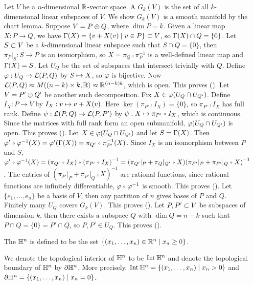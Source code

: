 \documentclass[10pt]{article}
\begin{document}
\begin{example}
    Let $V$ be a $n$-dimensional $\mathbb{R}$-vector space. A  ${G}_{k}(V)$ is the set of all $k$-dimensional linear subspaces of $V$. We show ${G}_{k}(V)$ is a smooth manifold by the chart lemma. Suppose $V=P\oplus Q$, where $\dim P=k$. Given a linear map $X:P\to Q$, we have $\Gamma(X)=\{v+X(v)\mid v\in P\}\subset V$, so $\Gamma(X)\cap Q=\{0\}$. Let $S\subset V$ be a $k$-dimensional linear subspace such that $S\cap Q=\{0\}$, then ${\pi}_{P}{|}_{S}:S\to P$ is an isomorphism, so $X={\pi}_{Q}\comp{\pi}_{P}^{-1}$ is a well-defined linear map and $\Gamma(X)=S$. Let ${U}_{Q}$ be the set of subspaces that intersect trivially with $Q$. Define $\varphi:{U}_{Q}\to\mathcal{L}(P,Q)$ by $S\mapsto X$, so $\varphi$ is bijective. Now $\mathcal{L}(P,Q)\approx M((n-k)\times k,\mathbb{R})\approx{\mathbb{R}}^{(n-k)k}$, which is open. This proves (). Let $V=P'\oplus Q'$ be another such decomposition. Fix $X\in\varphi({U}_{Q}\cap{U}_{Q'})$. Define ${I}_{X}:P\to V$ by ${I}_{X}:v\mapsto v+X(v)$. Here $\ker({\pi}_{P'}\comp{I}_{X})=\{0\}$, so ${\pi}_{P'}\comp{I}_{X}$ has full rank. Define $\psi:\mathcal{L}(P,Q)\to\mathcal{L}(P,P')$ by $\psi:X\mt{\pi}_{P'}\comp{I}_{X}$, which is continuous. Since the matrices with full rank form an open submanifold, $\varphi({U}_{Q}\cap{U}_{Q'})$ is open. This proves (). Let $X\in\varphi({U}_{Q}\cap{U}_{Q'})$ and let $S=\Gamma(X)$. Then $\vp'\comp{\vp}^{-1}(X)=\vp'(\Ga(X))={\pi}_{Q'}\comp{\pi}_{P'}^{-1}(X)$. Since ${I}_{X}$ is an isomorphism between $P$ and $S$, $\vp'\comp{\vp}^{-1}(X)=({\pi}_{Q'}\comp{I}_{X})\comp{({\pi}_{P'}\comp{I}_{X})}^{-1}=({\pi}_{Q'}{|}_{P}+{\pi}_{Q}{|}_{Q'}\comp X){({\pi}_{P'}{|}_{P}+{\pi}_{P'}{|}_{Q}\comp X)}^{-1}$. The entries of ${({\pi}_{P'}{|}_{P}+{\pi}_{P'}{|}_{Q}\comp X)}^{-1}$ are rational functions, since rational functions are infinitely differentiable, $\vp\comp{\vp}^{-1}$ is smooth. This proves (). Let $\{{e}_{1},\dots,{e}_{n}\}$ be a basis of $V$, then any partition of $n$ gives bases of $P$ and $Q$. Finitely many ${U}_{Q}$ covers ${G}_{k}(V)$. This proves (). Let $P,P'\subset V$ be subspaces of dimension $k$, then there exists a subspace $Q$ with $\dim Q=n-k$ such that $P\cap Q=\{0\}=P'\cap Q$, so $P,P'\in{U}_{Q}$. This proves ().
\end{example}
\begin{definition}
    The  ${\mathbb{H}}^{n}$ is defined to be the set $\{({x}_{1},\dots,{x}_{n})\in{\mathbb{R}}^{n}\mid{x}_{n}\ge 0\}$.
\end{definition}
\par
We denote the topological interior of ${\mathbb{H}}^{n}$ to be $\operatorname{Int}{\mathbb{H}}^{n}$ and denote the topological boundary of ${\mathbb{H}}^{n}$ by $\partial{\mathbb{H}}^{n}$. More precisely, $\operatorname{Int}{\mathbb{H}}^{n}=\{({x}_{1},\dots,{x}_{n})\mid{x}_{n}>0\}$ and $\partial{\mathbb{H}}^{n}=\{({x}_{1},\dots,{x}_{n})\mid{x}_{n}=0\}$.
\end{document}

